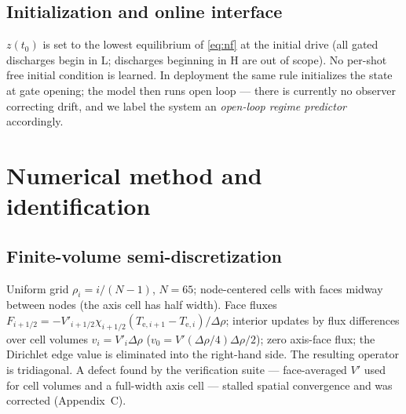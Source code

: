 \documentclass[11pt]{article}
\newcommand{\lat}{z}
\begin{document}
\subsection{Initialization and online interface}
\label{sec:model-init}

$\lat(t_0)$ is set to the lowest equilibrium of \eqref{eq:nf} at the
initial drive (all gated discharges begin in L; discharges beginning in H
are out of scope). No per-shot free initial condition is learned. In
deployment the same rule initializes the state at gate opening; the model
then runs open loop --- there is currently no observer correcting drift,
and we label the system an \emph{open-loop regime predictor} accordingly.

\section{Numerical method and identification}
\label{sec:numerics}

\subsection{Finite-volume semi-discretization}
Uniform grid $\rho_i = i/(N-1)$, $N = 65$; node-centered cells with faces
midway between nodes (the axis cell has half width). Face fluxes
$F_{i+1/2} = -V'_{i+1/2} \chi_{i+1/2} (T_{\mathrm{e},i+1} - T_{\mathrm{e},i})/\Delta\rho$;
interior updates by flux differences over cell volumes
$v_i = V'_i \Delta\rho$ ($v_0 = V'(\Delta\rho/4)\Delta\rho/2$); zero
axis-face flux; the Dirichlet edge value is eliminated into the
right-hand side. The resulting operator is tridiagonal. A defect found by
the verification suite --- face-averaged $V'$ used for cell volumes and a
full-width axis cell --- stalled spatial convergence and was corrected
(Appendix~C).
\end{document}
